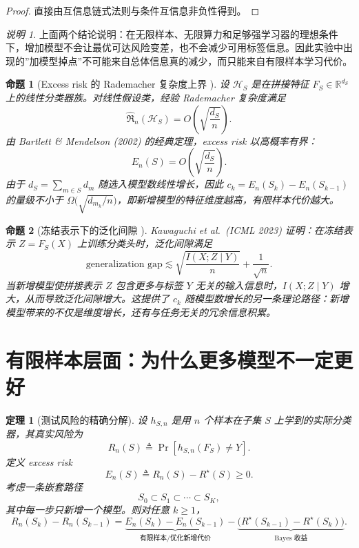 \documentclass[UTF8,fontset=fandol]{ctexart}
\newtheorem{theorem}{定理}
\newtheorem{proposition}{命题}
\theoremstyle{remark}
\newtheorem{remark}{说明}
\begin{document}
\begin{proof}
直接由互信息链式法则与条件互信息非负性得到。
\end{proof}

\begin{remark}
上面两个结论说明：在无限样本、无限算力和足够强学习器的理想条件下，增加模型不会让最优可达风险变差，也不会减少可用标签信息。因此实验中出现的”加模型掉点”不可能来自总体信息真的减少，而只能来自有限样本学习代价。
\end{remark}

\begin{proposition}[Excess risk 的 Rademacher 复杂度上界 \cite{bartlett2002rademacher}]
\label{prop:rademacher}
设 $\mathcal{H}_S$ 是在拼接特征 $F_S \in \mathbb{R}^{d_S}$ 上的线性分类器族。对线性假设类，经验 Rademacher 复杂度满足
\[
\hat{\mathfrak{R}}_n(\mathcal{H}_S) = O\!\left(\sqrt{\frac{d_S}{n}}\right).
\]
由 Bartlett \& Mendelson (2002) 的经典定理，excess risk 以高概率有界：
\[
E_n(S) = O\!\left(\sqrt{\frac{d_S}{n}}\right).
\]
由于 $d_S = \sum_{m \in S} d_m$ 随选入模型数线性增长，因此 $c_k = E_n(S_k) - E_n(S_{k-1})$ 的量级不小于 $\Omega\bigl(\sqrt{d_{m_k}/n}\bigr)$，即新增模型的特征维度越高，有限样本代价越大。
\end{proposition}

\begin{proposition}[冻结表示下的泛化间隙 \cite{kawaguchi2023does}]
\label{prop:kawaguchi}
Kawaguchi et al.\ (ICML 2023) 证明：在冻结表示 $Z = F_S(X)$ 上训练分类头时，泛化间隙满足
\[
\text{generalization gap} \lesssim \sqrt{\frac{I(X; Z \mid Y)}{n}} + \frac{1}{\sqrt{n}}.
\]
当新增模型使拼接表示 $Z$ 包含更多与标签 $Y$ 无关的输入信息时，$I(X; Z \mid Y)$ 增大，从而导致泛化间隙增大。这提供了 $c_k$ 随模型数增长的另一条理论路径：新增模型带来的不仅是维度增长，还有与任务无关的冗余信息积累。
\end{proposition}

\section{有限样本层面：为什么更多模型不一定更好}

\begin{theorem}[测试风险的精确分解]
设 $h_{S,n}$ 是用 $n$ 个样本在子集 $S$ 上学到的实际分类器，其真实风险为
\[
R_n(S) \triangleq \Pr[h_{S,n}(F_S) \neq Y].
\]
定义 excess risk
\[
E_n(S) \triangleq R_n(S) - R^\star(S) \ge 0.
\]
考虑一条嵌套路径
\[
S_0 \subset S_1 \subset \cdots \subset S_K,
\]
其中每一步只新增一个模型。则对任意 $k \ge 1$，
\[
R_n(S_k) - R_n(S_{k-1})
= \underbrace{E_n(S_k) - E_n(S_{k-1})}_{\text{有限样本/优化新增代价}}
- \underbrace{\big(R^\star(S_{k-1}) - R^\star(S_k)\big)}_{\text{Bayes 收益}}.
\]
\end{theorem}
\end{document}
